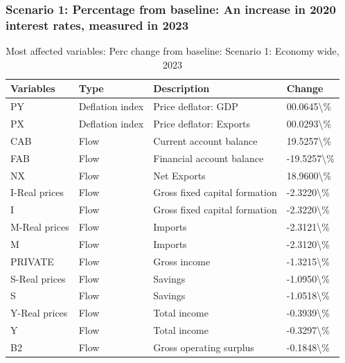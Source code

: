 \documentclass[
]{book}
\begin{document}
\hypertarget{scenario-1-percentage-from-baseline-an-increase-in-2020-interest-rates-measured-in-2023}{%
\subsubsection{Scenario 1: Percentage from baseline: An increase in 2020 interest rates, measured in 2023}\label{scenario-1-percentage-from-baseline-an-increase-in-2020-interest-rates-measured-in-2023}}

\begin{table}

\caption{\label{tab:most-affected-scenario-1-perc-2023-economy}Most affected variables: Perc change from baseline: Scenario 1: Economy wide, 2023}
\centering
\fontsize{10}{12}\selectfont
\begin{tabular}[t]{l|l|l|l}
\hline
Variables & Type & Description & Change\\
\hline
PY & Deflation index & Price deflator: GDP & 00.0645\textbackslash{}\%\\
\hline
PX & Deflation index & Price deflator: Exports & 00.0293\textbackslash{}\%\\
\hline
CAB & Flow & Current account balance & 19.5257\textbackslash{}\%\\
\hline
FAB & Flow & Financial account balance & -19.5257\textbackslash{}\%\\
\hline
NX & Flow & Net Exports & 18.9600\textbackslash{}\%\\
\hline
I-Real prices & Flow & Gross fixed capital formation & -2.3220\textbackslash{}\%\\
\hline
I & Flow & Gross fixed capital formation & -2.3220\textbackslash{}\%\\
\hline
M-Real prices & Flow & Imports & -2.3121\textbackslash{}\%\\
\hline
M & Flow & Imports & -2.3120\textbackslash{}\%\\
\hline
PRIVATE & Flow & Gross income & -1.3215\textbackslash{}\%\\
\hline
S-Real prices & Flow & Savings & -1.0950\textbackslash{}\%\\
\hline
S & Flow & Savings & -1.0518\textbackslash{}\%\\
\hline
Y-Real prices & Flow & Total income & -0.3939\textbackslash{}\%\\
\hline
Y & Flow & Total income & -0.3297\textbackslash{}\%\\
\hline
B2 & Flow & Gross operating surplus & -0.1848\textbackslash{}\%\\

\end{tabular}
\end{table}
\end{document}
